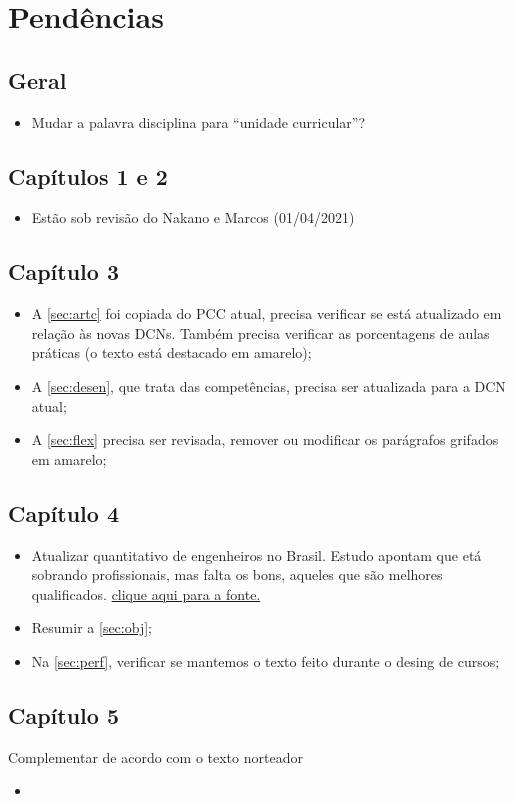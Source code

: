 \chapter*{Pendências}

\section*{Geral}

\begin{itemize}
 	\item Mudar a palavra disciplina para ``unidade curricular''?
\end{itemize}

\section*{Capítulos 1 e 2}

\begin{itemize}
	\item Estão sob revisão do Nakano e Marcos (01/04/2021)
\end{itemize}

\section*{Capítulo 3}

\begin{itemize}
	\item A \autoref{sec:artc} foi copiada do PCC atual, precisa verificar se está atualizado em relação às novas DCNs. Também precisa verificar as porcentagens de aulas práticas (o texto está destacado em amarelo);
	\item A \autoref{sec:desen}, que trata das competências, precisa ser atualizada para a DCN atual;
	\item A \autoref{sec:flex} precisa ser revisada, remover ou modificar os parágrafos grifados em amarelo;
\end{itemize}

\section*{Capítulo 4}

\begin{itemize}
	\item Atualizar quantitativo de engenheiros no Brasil. Estudo apontam que etá sobrando profissionais, mas falta os bons, aqueles que são melhores qualificados. \href{https://sites.usp.br/lgi/em-tres-anos-numero-de-engenheiros-formados-ja-supera-em-25-vezes-demanda-prevista-para-2020/}{clique aqui para a fonte.}
	\item Resumir a \autoref{sec:obj};
	\item Na \autoref{sec:perf}, verificar se mantemos o texto feito durante o desing de cursos;
\end{itemize}

\section*{Capítulo 5}

Complementar de acordo com o texto norteador

\begin{itemize}
	\item 
\end{itemize}